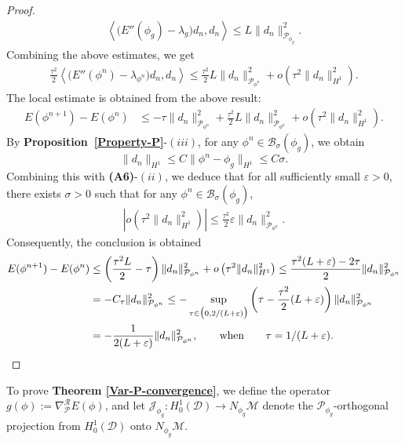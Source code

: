 \documentclass[preprint,3p]{elsarticle}
\begin{document}
\begin{proof}
	\begin{align*}
		\left\langle \big(E''(\phi_g)-\lambda_g\big)d_n,d_n\right\rangle\le L\|d_n\|^2_{\mathcal{P}_{\phi_g}}.
	\end{align*}
	Combining the above estimates, we get 
	\begin{align*}
		\frac{\tau^2}{2}\left\langle \big(E''(\phi^n)-\lambda_{\phi^n}\big)d_n,d_n\right\rangle
		\le \frac{\tau^2}{2}L\|d_n\|^2_{\mathcal{P}_{\phi^n}}+o	\left(\tau^2\|d_n\|^2_{H^1}\right).
	\end{align*}
	The local estimate is obtained from the above result:
	\begin{align*}
		E(\phi^{n+1})-E(\phi^n)&\le-\tau\|d_n\|^2_{\mathcal{P}_{\phi^n}}+\frac{\tau^2}{2}L\|d_n\|^2_{\mathcal{P}_{\phi^n}}+o\left(\tau^2\|d_n\|^2_{H^1}\right).
	\end{align*}
	{By \textbf{Proposition~\ref{Property-P}}-$(iii)$, for any $\phi^n \in \mathcal{B}_{\sigma}(\phi_g)$, we obtain
	\[
	\|d_n\|_{H^1}\le C\|\phi^n-\phi_g\|_{H^1}\le C\sigma.
	\]
	Combining this with \textbf{(A6)}-$(ii)$, we deduce that for all sufficiently small $\varepsilon > 0$, there exists $\sigma > 0$ such that for any $\phi^n \in \mathcal{B}_{\sigma}(\phi_g)$,}
	\begin{align*}
		\left|o\left(\tau^2\|d_n\|^2_{H^1}\right)\right|\le\frac{\tau^2}{2}\varepsilon\|d_n\|^2_{\mathcal{P}_{\phi^n}}.
	\end{align*}
	Consequently, the conclusion is obtained
	\begin{align*}
		E(\phi^{n+1})-E(\phi^n)
		&\le\left(\frac{\tau^2L}{2}-\tau\right)\|d_n\|^2_{\mathcal{P}_{\phi^n}}+o\left(\tau^2\|d_n\|^2_{H^1}\right)
		\le \frac{\tau^2(L+\varepsilon)-2\tau}{2} \|d_n\|^2_{\mathcal{P}_{\phi^n}}\\
		&=-C_{\tau}\|d_n\|^2_{\mathcal{P}_{\phi^n}}
		\le-\sup\limits_{\tau\in\big(0,2/(L+\varepsilon)\big)}\left(\tau-\frac{\tau^2}{2}(L+\varepsilon)\right)\|d_n\|^2_{\mathcal{P}_{\phi^n}}\\
		&=-\frac{1}{2(L+\varepsilon)}\|d_n\|^2_{\mathcal{P}_{\phi^n}},\qquad {\rm when}\qquad \tau=1/(L+\varepsilon).
	\end{align*}
\end{proof}

To prove {\bf Theorem \ref{Var-P-convergence}}, we define the operator \(g(\phi) :=\nabla^{\mathcal{R}}_{\mathcal{P}} E(\phi)\), and let \(\mathcal{J}_{\phi_g}: H_0^1(\mathcal{D}) \to N_{\phi_g}\mathcal{M}\) denote the $\mathcal{P}_{\phi_g}$-orthogonal projection from $H^1_0(\mathcal{D})$ onto $N_{\phi_g}\mathcal{M}$.  
\end{document}
